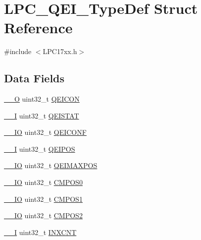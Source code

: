 \hypertarget{structLPC__QEI__TypeDef}{}\section{L\+P\+C\+\_\+\+Q\+E\+I\+\_\+\+Type\+Def Struct Reference}
\label{structLPC__QEI__TypeDef}


{\ttfamily \#include $<$L\+P\+C17xx.\+h$>$}

\subsection*{Data Fields}
\begin{DoxyCompactItemize}
\item 
\hyperlink{LPC17xx_8h_a7e25d9380f9ef903923964322e71f2f6}{\+\_\+\+\_\+O} uint32\+\_\+t \hyperlink{structLPC__QEI__TypeDef_acdad8732bc69abc81a15ebad50cf48ea}{Q\+E\+I\+C\+ON}
\item 
\hyperlink{LPC17xx_8h_af63697ed9952cc71e1225efe205f6cd3}{\+\_\+\+\_\+I} uint32\+\_\+t \hyperlink{structLPC__QEI__TypeDef_ad26ec677f7a9574b537ad91fa6a69a08}{Q\+E\+I\+S\+T\+AT}
\item 
\hyperlink{LPC17xx_8h_aec43007d9998a0a0e01faede4133d6be}{\+\_\+\+\_\+\+IO} uint32\+\_\+t \hyperlink{structLPC__QEI__TypeDef_aac33dc0f19dd0ed0132c86f0d0f7d64d}{Q\+E\+I\+C\+O\+NF}
\item 
\hyperlink{LPC17xx_8h_af63697ed9952cc71e1225efe205f6cd3}{\+\_\+\+\_\+I} uint32\+\_\+t \hyperlink{structLPC__QEI__TypeDef_a4cd685a0c827793ba0c7e28ec13cb74b}{Q\+E\+I\+P\+OS}
\item 
\hyperlink{LPC17xx_8h_aec43007d9998a0a0e01faede4133d6be}{\+\_\+\+\_\+\+IO} uint32\+\_\+t \hyperlink{structLPC__QEI__TypeDef_a0e31769d6c9fe5d4e8c4b425d227b6bf}{Q\+E\+I\+M\+A\+X\+P\+OS}
\item 
\hyperlink{LPC17xx_8h_aec43007d9998a0a0e01faede4133d6be}{\+\_\+\+\_\+\+IO} uint32\+\_\+t \hyperlink{structLPC__QEI__TypeDef_a78d0e472de69a6191632cc00c7a01f3e}{C\+M\+P\+O\+S0}
\item 
\hyperlink{LPC17xx_8h_aec43007d9998a0a0e01faede4133d6be}{\+\_\+\+\_\+\+IO} uint32\+\_\+t \hyperlink{structLPC__QEI__TypeDef_ae49fa2464aac3f124c22f4a3f57ee818}{C\+M\+P\+O\+S1}
\item 
\hyperlink{LPC17xx_8h_aec43007d9998a0a0e01faede4133d6be}{\+\_\+\+\_\+\+IO} uint32\+\_\+t \hyperlink{structLPC__QEI__TypeDef_a16d30971f7330c1e155fb16e7a353263}{C\+M\+P\+O\+S2}
\item 
\hyperlink{LPC17xx_8h_af63697ed9952cc71e1225efe205f6cd3}{\+\_\+\+\_\+I} uint32\+\_\+t \hyperlink{structLPC__QEI__TypeDef_aff2e49f51268eb6ffbec601e665be1a8}{I\+N\+X\+C\+NT}

\end{DoxyCompactItemize}

